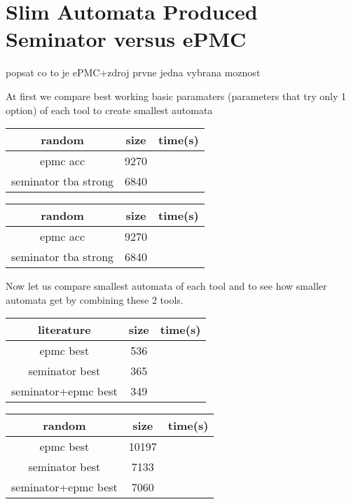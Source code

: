 \documentclass[
	digital
nolof, nolot
]{fithesis3}
\newcommand{\hlineny}{\hline}
\begin{document}
		\section{Slim Automata Produced Seminator versus ePMC}
		popsat co to je ePMC+zdroj
		prvne jedna vybrana moznost
		
		At first we compare best working basic paramaters (parameters that try only 1 option) of each tool to create smallest automata

	\begin{center}
		\begin{tabular}{ |c|c|c| } 
			\hline
			random&size&time(s)\\
			\hline
			epmc acc&9270 & \\
			\hline
			seminator tba strong &6840 & \\
			\hlineny
		\end{tabular}
	\end{center}
	\begin{center}
		\begin{tabular}{ |c|c|c| } 
			\hline
			random&size&time(s)\\
			\hline
			epmc acc&9270 & \\
			\hline
			seminator tba strong &6840 & \\
			\hlineny
		\end{tabular}
	\end{center}
		Now let us compare smallest automata of each tool and to see how smaller automata get by combining these 2 tools.
		\begin{center}
			\begin{tabular}{ |c|c|c| } 
				\hline
				literature&size&time(s)\\
				\hline
				epmc best&536 & \\
				\hline
				seminator best &365 & \\
				\hlineny
				seminator+epmc best &349 & \\ 
				\hlineny
			\end{tabular}
		\end{center}
	\begin{center}
		\begin{tabular}{ |c|c|c| } 
			\hline
			random&size&time(s)\\
			\hline
			epmc best&10197 & \\
			\hline
			seminator best &7133 & \\
			\hlineny
			seminator+epmc best &7060 & \\ 
			\hlineny
		\end{tabular}
	\end{center}
\end{document}
